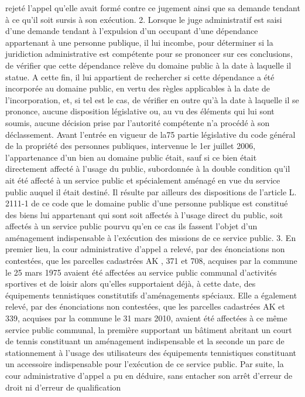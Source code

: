 \documentclass[11pt,a4paper]{report}
\begin{document}
rejeté l'appel qu'elle avait formé contre ce jugement ainsi que sa demande tendant à ce qu'il soit sursis à son
exécution.
2. Lorsque le juge administratif est saisi d'une demande tendant à l'expulsion d'un occupant d'une dépendance
appartenant à une personne publique, il lui incombe, pour déterminer si la juridiction administrative est
compétente pour se prononcer sur ces conclusions, de vérifier que cette dépendance relève du domaine public à
la date à laquelle il statue. A cette fin, il lui appartient de rechercher si cette dépendance a été incorporée au
domaine public, en vertu des règles applicables à la date de l'incorporation, et, si tel est le cas, de vérifier en outre
qu'à la date à laquelle il se prononce, aucune disposition législative ou, au vu des éléments qui lui sont soumis,
aucune décision prise par l'autorité compétente n'a procédé à son déclassement. Avant l'entrée en vigueur de la75
partie législative du code général de la propriété des personnes publiques, intervenue le 1er juillet 2006,
l'appartenance d'un bien au domaine public était, sauf si ce bien était directement affecté à l'usage du public,
subordonnée à la double condition qu'il ait été affecté à un service public et spécialement aménagé en vue du
service public auquel il était destiné. Il résulte par ailleurs des dispositions de l'article L. 2111-1 de ce code que
le domaine public d'une personne publique est constitué des biens lui appartenant qui sont soit affectés à l'usage
direct du public, soit affectés à un service public pourvu qu'en ce cas ils fassent l'objet d'un aménagement
indispensable à l'exécution des missions de ce service public.
3. En premier lieu, la cour administrative d'appel a relevé, par des énonciations non contestées, que les parcelles
cadastrées AK , 371 et 708, acquises par la commune le 25 mars 1975 avaient été affectées au service public
communal d'activités sportives et de loisir alors qu'elles supportaient déjà, à cette date, des équipements
tennistiques constitutifs d'aménagements spéciaux. Elle a également relevé, par des énonciations non contestées,
que les parcelles cadastrées AK  et 339, acquises par la commune le 31 mars 2010, avaient été affectées à
ce même service public communal, la première supportant un bâtiment abritant un court de tennis constituant un
aménagement indispensable et la seconde un parc de stationnement à l'usage des utilisateurs des équipements
tennistiques constituant un accessoire indispensable pour l'exécution de ce service public. Par suite, la cour
administrative d'appel a pu en déduire, sans entacher son arrêt d'erreur de droit ni d'erreur de qualification
\end{document}
